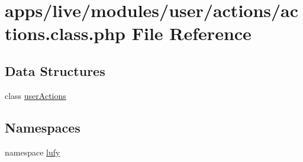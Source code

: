 \hypertarget{live_2modules_2user_2actions_2actions_8class_8php}{\section{apps/live/modules/user/actions/actions.class.\-php File Reference}
\label{live_2modules_2user_2actions_2actions_8class_8php}
}
\subsection*{Data Structures}
\begin{DoxyCompactItemize}
\item 
class \hyperlink{classuser_actions}{user\-Actions}
\end{DoxyCompactItemize}
\subsection*{Namespaces}
\begin{DoxyCompactItemize}
\item 
namespace \hyperlink{namespacelufy}{lufy}
\end{DoxyCompactItemize}
